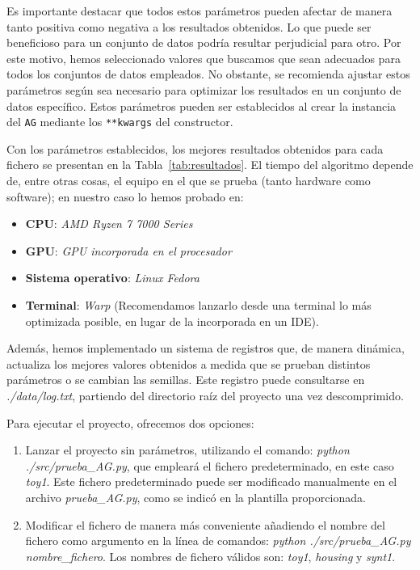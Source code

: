 \documentclass[conference,a4paper]{IEEEtran}
\begin{document}
Es importante destacar que todos estos parámetros pueden afectar de manera tanto positiva como negativa a los resultados obtenidos. Lo que puede ser beneficioso para un conjunto de datos podría resultar perjudicial para otro. Por este motivo, hemos seleccionado valores que buscamos que sean adecuados para todos los conjuntos de datos empleados. No obstante, se recomienda ajustar estos parámetros según sea necesario para optimizar los resultados en un conjunto de datos específico. Estos parámetros pueden ser establecidos al crear la instancia del \texttt{AG} mediante los \texttt{**kwargs} del constructor.

Con los parámetros establecidos, los mejores resultados obtenidos para cada fichero se presentan en la Tabla~\ref{tab:resultados}. El tiempo del algoritmo depende de, entre otras cosas, el equipo en el que se prueba (tanto hardware como software); en nuestro caso lo hemos probado en:
\begin{itemize}
    \item \textbf{CPU}: \textit{AMD Ryzen 7 7000 Series}
    \item \textbf{GPU}: \textit{GPU incorporada en el procesador}
    \item \textbf{Sistema operativo}: \textit{Linux Fedora}
    \item \textbf{Terminal}: \textit{Warp} (Recomendamos lanzarlo desde una terminal lo más optimizada posible, en lugar de la incorporada en un IDE).
    
\end{itemize}

Además, hemos implementado un sistema de registros que, de manera dinámica, actualiza los mejores valores obtenidos a medida que se prueban distintos parámetros o se cambian las semillas. Este registro puede consultarse en \textit{./data/log.txt}, partiendo del directorio raíz del proyecto una vez descomprimido.

Para ejecutar el proyecto, ofrecemos dos opciones: 
\begin{enumerate}
    \item Lanzar el proyecto sin parámetros, utilizando el comando: \textit{python ./src/prueba\_AG.py}, que empleará el fichero predeterminado, en este caso \textit{toy1}. Este fichero predeterminado puede ser modificado manualmente en el archivo \textit{prueba\_AG.py}, como se indicó en la plantilla proporcionada.

    \item Modificar el fichero de manera más conveniente añadiendo el nombre del fichero como argumento en la línea de comandos: \textit{python ./src/prueba\_AG.py nombre\_fichero}. Los nombres de fichero válidos son: \textit{toy1}, \textit{housing} y \textit{synt1}.
\end{enumerate}
\end{document}
